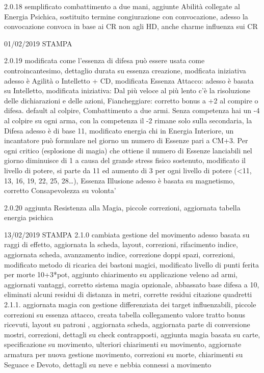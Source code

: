 \documentclass[a4paper,11pt,twoside,openany]{book}
\begin{document}
{	2.0.18 semplificato combattimento a due mani, aggiunte Abilità collegate al Energia Psichica, sostituito termine congiurazione con convocazione, adesso la convocazione convoca in base ai CR non agli HD, anche charme influenza sui CR

	01/02/2019 STAMPA

	2.0.19 modificata come l'essenza di difesa può essere usata come controincantesimo, dettaglio durata su essenza creazione, modficata iniziativa adesso è Agilità o Intelletto + CD, modificata Essenza Attacco: adesso è basata su Intelletto, modificata iniziativa: Dal più veloce al più lento c'è la risoluzione delle dichiarazioni e delle azioni, Fiancheggiare: corretto bonus a +2 al compire o difesa. default al colpire, Combattimento a due armi. Senza competenza hai un -4 al colpire su ogni arma, con la competenza il -2 rimane solo sulla secondaria, la Difesa adesso è di base 11, modificato energia chi in Energia Interiore, un incantatore può formulare nel giorno un numero di Essenze pari a CM+3. Per ogni critico (esplosione di magia) che ottiene il numero di Essenze lanciabili nel giorno diminuisce di 1 a causa del grande stress fisico sostenuto, modificato il livello di potere, si parte da 11 ed aumento di 3 per ogni livello di potere (\textless11, 13, 16, 19, 22, 25, 28\ldots ), Essenza Illusione adesso è basata su magnetismo, corretto Consapevolezza su volonta'

	2.0.20 aggiunta Resistenza alla Magia, piccole correzioni, aggiornata tabella energia psichica

	13/02/2019 STAMPA
	2.1.0 cambiata gestione del movimento adesso basata su raggi di effetto, aggiornata la scheda, layout, correzioni, rifacimento indice, aggiornata scheda, avanzamento indice, correzione doppi spazi, correzioni, modificato metodo di ricarica dei bastoni magici, modificato livello di punti ferita per morte 10+3*pot, aggiunto chiarimento su applicazione veleno ad armi, aggiornati vantaggi, corretto sistema magia opzionale, abbassato base difesa a 10, eliminati alcuni residui di distanza in metri, corrette residui citazione quadretti 2.1.1. aggiornata magia con gestione differenziata dei target influenzabili, piccole correzioni su essenza attacco, creata tabella collegamento valore tratto bonus ricevuti, layout su patroni , aggiornata scheda, aggiornata parte di conversione mostri, correzioni, dettagli su check contrapposti, aggiunta magia basata su carte, specificazione su movimento, ulteriori chiarimenti su movimento, aggiornate armatura per nuova gestione movimento, correzioni su morte, chiarimenti su Seguace e Devoto, dettagli su neve e nebbia connessi a movimento

}
\end{document}
